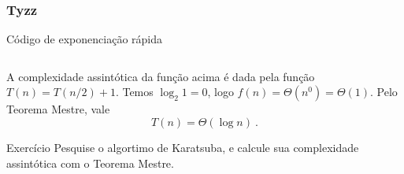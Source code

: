 \begin{frame}[fragile]
    \frametitle{Tyzz}

    \begin{block}{Código de exponenciação rápida}
        \footnotesize
        \inputminted{cpp}{codigos/fexp.cpp}    
    \end{block}

    A complexidade assintótica da função acima é dada pela função $T(n) = T(n/2) + 1$. Temos $\log_2 1 = 0$, logo $f(n) = \Theta(n^0) = \Theta(1)$. Pelo Teorema Mestre, vale
        \[ T(n) =  \Theta(\log n) \ . \]

    \begin{block}{Exercício}
        Pesquise o algortimo de Karatsuba, e calcule sua complexidade assintótica com o Teorema Mestre.
    \end{block}

    
\end{frame}